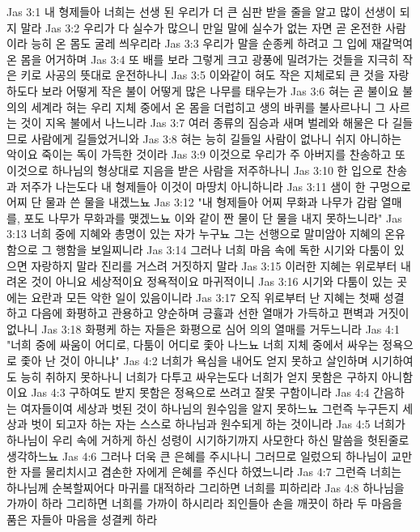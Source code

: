 Jas 3:1  내 형제들아 너희는 선생 된 우리가 더 큰 심판 받을 줄을 알고 많이 선생이 되지 말라
Jas 3:2  우리가 다 실수가 많으니 만일 말에 실수가 없는 자면 곧 온전한 사람이라 능히 온 몸도 굴레 씌우리라
Jas 3:3  우리가 말을 순종케 하려고 그 입에 재갈먹여 온 몸을 어거하며
Jas 3:4  또 배를 보라 그렇게 크고 광풍에 밀려가는 것들을 지극히 작은 키로 사공의 뜻대로 운전하나니
Jas 3:5  이와같이 혀도 작은 지체로되 큰 것을 자랑하도다 보라 어떻게 작은 불이 어떻게 많은 나무를 태우는가
Jas 3:6  혀는 곧 불이요 불의의 세계라 혀는 우리 지체 중에서 온 몸을 더럽히고 생의 바퀴를 불사르나니 그 사르는 것이 지옥 불에서 나느니라
Jas 3:7  여러 종류의 짐승과 새며 벌레와 해물은 다 길들므로 사람에게 길들었거니와
Jas 3:8  혀는 능히 길들일 사람이 없나니 쉬지 아니하는 악이요 죽이는 독이 가득한 것이라
Jas 3:9  이것으로 우리가 주 아버지를 찬송하고 또 이것으로 하나님의 형상대로 지음을 받은 사람을 저주하나니
Jas 3:10  한 입으로 찬송과 저주가 나는도다 내 형제들아 이것이 마땅치 아니하니라
Jas 3:11  샘이 한 구멍으로 어찌 단 물과 쓴 물을 내겠느뇨
Jas 3:12  "내 형제들아 어찌 무화과 나무가 감람 열매를, 포도 나무가 무화과를 맺겠느뇨 이와 같이 짠 물이 단 물을 내지 못하느니라"
Jas 3:13  너희 중에 지혜와 총명이 있는 자가 누구뇨 그는 선행으로 말미암아 지혜의 온유함으로 그 행함을 보일찌니라
Jas 3:14  그러나 너희 마음 속에 독한 시기와 다툼이 있으면 자랑하지 말라 진리를 거스려 거짓하지 말라
Jas 3:15  이러한 지혜는 위로부터 내려온 것이 아니요 세상적이요 정욕적이요 마귀적이니
Jas 3:16  시기와 다툼이 있는 곳에는 요란과 모든 악한 일이 있음이니라
Jas 3:17  오직 위로부터 난 지혜는 첫째 성결하고 다음에 화평하고 관용하고 양순하며 긍휼과 선한 열매가 가득하고 편벽과 거짓이 없나니
Jas 3:18  화평케 하는 자들은 화평으로 심어 의의 열매를 거두느니라
Jas 4:1  "너희 중에 싸움이 어디로, 다툼이 어디로 좇아 나느뇨 너희 지체 중에서 싸우는 정욕으로 좇아 난 것이 아니냐"
Jas 4:2  너희가 욕심을 내어도 얻지 못하고 살인하며 시기하여도 능히 취하지 못하나니 너희가 다투고 싸우는도다 너희가 얻지 못함은 구하지 아니함이요
Jas 4:3  구하여도 받지 못함은 정욕으로 쓰려고 잘못 구함이니라
Jas 4:4  간음하는 여자들이여 세상과 벗된 것이 하나님의 원수임을 알지 못하느뇨 그런즉 누구든지 세상과 벗이 되고자 하는 자는 스스로 하나님과 원수되게 하는 것이니라
Jas 4:5  너희가 하나님이 우리 속에 거하게 하신 성령이 시기하기까지 사모한다 하신 말씀을 헛된줄로 생각하느뇨
Jas 4:6  그러나 더욱 큰 은혜를 주시나니 그러므로 일렀으되 하나님이 교만한 자를 물리치시고 겸손한 자에게 은혜를 주신다 하였느니라
Jas 4:7  그런즉 너희는 하나님께 순복할찌어다 마귀를 대적하라 그리하면 너희를 피하리라
Jas 4:8  하나님을 가까이 하라 그리하면 너희를 가까이 하시리라 죄인들아 손을 깨끗이 하라 두 마음을 품은 자들아 마음을 성결케 하라
